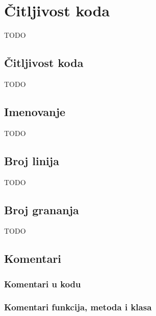\chapter{Čitljivost koda}

TODO

\section{Čitljivost koda}

TODO

\section{Imenovanje}

TODO

\section{Broj linija}

TODO

\section{Broj grananja}

TODO

\section{Komentari}

\subsection{Komentari u kodu}

\subsection{Komentari funkcija, metoda i klasa}
